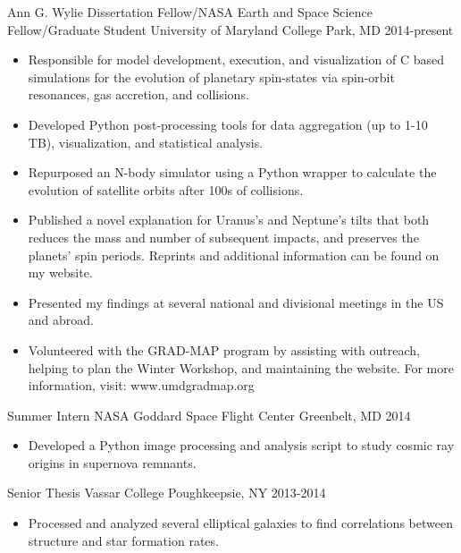 \documentclass[]{awesome-cv}
\begin{document}
\begin{cventries}
	\cventry
	{Ann G. Wylie Dissertation Fellow/NASA Earth and Space Science Fellow/Graduate Student}
	{University of Maryland}
	{College Park, MD}
	{2014-present}
	{\vspace{-3mm}
		\begin{itemize}
			\item Responsible for model development, execution, and visualization of C based simulations for the evolution of planetary spin-states via spin-orbit resonances, gas accretion, and collisions. \vspace{0.7mm}
			\item Developed Python post-processing tools for data aggregation (up to 1-10 TB), visualization, and statistical analysis. \vspace{0.7mm}
			\item Repurposed an N-body simulator using a Python wrapper to calculate the evolution of satellite orbits after 100s of collisions. \vspace{0.7mm}
			\item Published a novel explanation for Uranus's and Neptune's tilts that both reduces the mass and number of subsequent impacts, and preserves the planets' spin periods. Reprints and additional information can be found on my website. \vspace{0.7mm}
			\item Presented my findings at several national and divisional meetings in the US and abroad. \vspace{0.7mm}
			\item Volunteered with the GRAD-MAP program by assisting with outreach, helping to plan the Winter Workshop, and maintaining the website. For more information, visit: www.umdgradmap.org \vspace{0.7mm}
		\end{itemize}
	}

	\vspace{-6mm}
	\cventry
	{Summer Intern}
	{NASA Goddard Space Flight Center}
	{Greenbelt, MD}
	{2014}
	{\vspace{-3mm}
		\begin{itemize}
			\item Developed a Python image processing and analysis script to study cosmic ray origins in supernova remnants. 
	\end{itemize}
	}
	
	\vspace{-6mm}
	\cventry
	{Senior Thesis}
	{Vassar College}
	{Poughkeepsie, NY}
	{2013-2014}
	{\vspace{-3mm}
		\begin{itemize}
			\item Processed and analyzed several elliptical galaxies to find correlations between structure and star formation rates.
	\end{itemize}
	}
	

\end{cventries}
\end{document}
